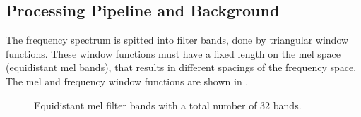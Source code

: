 \subsection{Processing Pipeline and Background}
The frequency spectrum is spitted into filter bands, done by triangular window functions.
These window functions must have a fixed length on the mel space (equidistant mel bands), that results in different spacings of
the frequency space. The mel and frequency window functions are shown in .
\begin{figure}[!ht]
  \centering
  \quad
  \caption{Equidistant mel filter bands with a total number of 32 bands.}
  \label{fig:filter_bands}
\end{figure}
\FloatBarrier
\noindent

